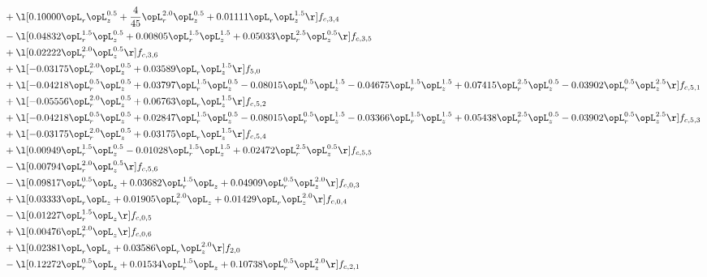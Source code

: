 \begin{alignat}{2}
& + \l[  0.10000 \opL_r \opL_z^{0.5} + \frac{4}{45} \opL_r^{2.0} \opL_z^{0.5} +  0.01111 \opL_r \opL_z^{1.5}  \r] f_{c,3,4} \nonumber \\ 
& - \l[  0.04832 \opL_r^{1.5} \opL_z^{0.5} +  0.00805 \opL_r^{1.5} \opL_z^{1.5} +  0.05033 \opL_r^{2.5} \opL_z^{0.5}  \r] f_{c,3,5} \nonumber \\ 
& + \l[  0.02222 \opL_r^{2.0} \opL_z^{0.5}  \r] f_{c,3,6} \nonumber \\ 
& + \l[  -0.03175 \opL_r^{2.0} \opL_z^{0.5} +  0.03589 \opL_r \opL_z^{1.5}  \r] f_{5,0} \nonumber \\ 
& + \l[  -0.04218 \opL_r^{0.5} \opL_z^{0.5} +  0.03797 \opL_r^{1.5} \opL_z^{0.5}   -0.08015 \opL_r^{0.5} \opL_z^{1.5}   -0.04675 \opL_r^{1.5} \opL_z^{1.5} +  0.07415 \opL_r^{2.5} \opL_z^{0.5}   -0.03902 \opL_r^{0.5} \opL_z^{2.5}  \r] f_{c,5,1} \nonumber \\ 
& + \l[  -0.05556 \opL_r^{2.0} \opL_z^{0.5} +  0.06763 \opL_r \opL_z^{1.5}  \r] f_{c,5,2} \nonumber \\ 
& + \l[  -0.04218 \opL_r^{0.5} \opL_z^{0.5} +  0.02847 \opL_r^{1.5} \opL_z^{0.5}   -0.08015 \opL_r^{0.5} \opL_z^{1.5}   -0.03366 \opL_r^{1.5} \opL_z^{1.5} +  0.05438 \opL_r^{2.5} \opL_z^{0.5}   -0.03902 \opL_r^{0.5} \opL_z^{2.5}  \r] f_{c,5,3} \nonumber \\ 
& + \l[  -0.03175 \opL_r^{2.0} \opL_z^{0.5} +  0.03175 \opL_r \opL_z^{1.5}  \r] f_{c,5,4} \nonumber \\ 
& + \l[  0.00949 \opL_r^{1.5} \opL_z^{0.5}   -0.01028 \opL_r^{1.5} \opL_z^{1.5} +  0.02472 \opL_r^{2.5} \opL_z^{0.5}  \r] f_{c,5,5} \nonumber \\ 
& - \l[  0.00794 \opL_r^{2.0} \opL_z^{0.5}  \r] f_{c,5,6} \nonumber \\ 
& - \l[  0.09817 \opL_r^{0.5} \opL_z +  0.03682 \opL_r^{1.5} \opL_z +  0.04909 \opL_r^{0.5} \opL_z^{2.0}  \r] f_{c,0,3} \nonumber \\ 
& + \l[  0.03333 \opL_r \opL_z +  0.01905 \opL_r^{2.0} \opL_z +  0.01429 \opL_r \opL_z^{2.0}  \r] f_{c,0,4} \nonumber \\ 
& - \l[  0.01227 \opL_r^{1.5} \opL_z  \r] f_{c,0,5} \nonumber \\ 
& + \l[  0.00476 \opL_r^{2.0} \opL_z  \r] f_{c,0,6} \nonumber \\ 
& + \l[  0.02381 \opL_r \opL_z +  0.03586 \opL_r \opL_z^{2.0}  \r] f_{2,0} \nonumber \\ 
& - \l[  0.12272 \opL_r^{0.5} \opL_z +  0.01534 \opL_r^{1.5} \opL_z +  0.10738 \opL_r^{0.5} \opL_z^{2.0}  \r] f_{c,2,1} \nonumber \\ 

\end{alignat}
